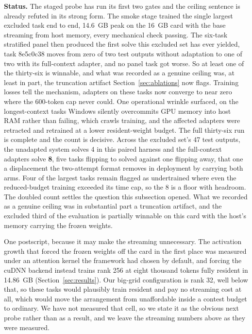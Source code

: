 \documentclass[11pt]{article}
\begin{document}
\textbf{Status.} The staged probe has run its first two gates and the ceiling sentence is already refuted
in its strong form. The smoke stage trained the single largest excluded task end to end, 14.6~GB peak on
the 16~GB card with the base streaming from host memory, every mechanical check passing. The six-task
stratified panel then produced the first solve this excluded set has ever yielded, task 8e5c0c38 moves from
zero of two test outputs without adaptation to one of two with its full-context adapter, and no panel task
got worse. So at least one of the thirty-six is winnable, and what was recorded as a genuine ceiling was,
at least in part, the truncation artifact Section~\ref{sec:ablations} now flags. Training losses tell the
mechanism, adapters on these tasks now converge to near zero where the 600-token cap never could. One
operational wrinkle surfaced, on the longest-context tasks Windows silently overcommits GPU memory into
host RAM rather than failing, which crawls training, and the affected adapters were retracted and retrained
at a lower resident-weight budget. The full thirty-six run is complete and the count is decisive. Across the
excluded set's 47 test outputs, the unadapted system solves 4 in this paired harness and the full-context
adapters solve \textbf{8}, five tasks flipping to solved against one flipping away, that one a displacement
the two-attempt format removes in deployment by carrying both arms. Four of the largest tasks remain
flagged as undertrained where even the reduced-budget training exceeded its time cap, so the 8 is a
floor with headroom. The doubled count settles the question this subsection opened. What we recorded as a
genuine ceiling was in substantial part a truncation artifact, and the excluded third of the evaluation is
partially winnable on this card with the host's memory carrying the frozen weights.

One postscript, because it may make the streaming unnecessary. The activation growth that forced the frozen
weights off the card in the first place was measured under an attention kernel the framework had chosen by
default, and forcing the cuDNN backend instead trains rank 256 at eight thousand tokens fully resident in
14.86~GB (Section~\ref{sec:results}). Our big-grid configuration is rank 32, well below that, so these
tasks would plausibly train resident and pay no streaming cost at all, which would move the arrangement
from unaffordable inside a contest budget to ordinary. We have not measured that cell, so we state it as
the obvious next probe rather than as a result, and we leave the streaming numbers above as they were
measured.
\end{document}
